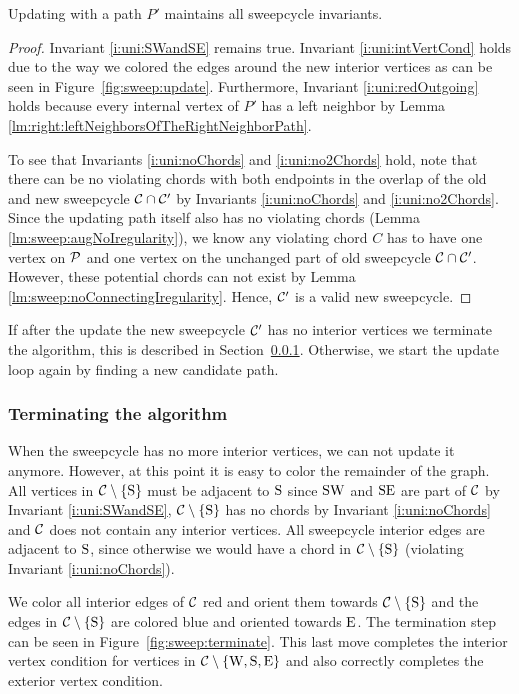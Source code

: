   \begin{lemma}
    \label{lm:sweep:updateMaintainsInvariants}
    Updating with a path $P'$ maintains all sweepcycle invariants.
  \end{lemma}
  \begin{proof}
    Invariant \ref{i:uni:SWandSE} remains true. Invariant \ref{i:uni:intVertCond} holds due to the way we colored the edges around the new interior vertices as can be seen in Figure~\ref{fig:sweep:update}.
    Furthermore, Invariant \ref{i:uni:redOutgoing} holds because every internal vertex of $P'$ has a left neighbor by Lemma \ref{lm:right:leftNeighborsOfTheRightNeighborPath}.

    To see that Invariants \ref{i:uni:noChords} and \ref{i:uni:no2Chords} hold, note that there can be no violating chords with both endpoints in the overlap of the old and new sweepcycle $\C \cap \C'$ by Invariants \ref{i:uni:noChords} and \ref{i:uni:no2Chords}.
    Since the updating path itself also has no violating chords (Lemma \ref{lm:sweep:augNoIregularity}),
    we know any violating chord $C$ has to have one vertex on $\P$ and one vertex on the unchanged part of old sweepcycle $\C \cap \C'$.
    However, these potential chords can not exist by Lemma \ref{lm:sweep:noConnectingIregularity}.
    Hence, $\C'$ is a valid new sweepcycle.
  \end{proof}

  If after the update the new sweepcycle $\C'$ has no interior vertices we terminate the algorithm,  this is described in Section~\ref{sss:terminating}.
  Otherwise, we start the update loop again by finding a new candidate path.

\subsubsection{Terminating the algorithm}
  \label{sss:terminating}
  When the sweepcycle has no more interior vertices, we can not update it anymore.
  However, at this point it is easy to color the remainder of the graph.
  All vertices in $\cpath$ must be adjacent to $\pS$ since $\pS \pW$ and $\pS \pE$ are part of $\C$ by Invariant \ref{i:uni:SWandSE}, $\cpath$ has no chords by Invariant \ref{i:uni:noChords} and $\C$ does not contain any interior vertices.
  All sweepcycle interior edges are adjacent to $\pS$, since otherwise we would have a chord in $\cpath$ (violating Invariant \ref{i:uni:noChords}).

  We color all interior edges of $\C$ red and orient them towards $\cpath$ and the edges in $\cpath$ are colored blue and oriented towards $\pE$. The termination step can be seen in Figure~\ref{fig:sweep:terminate}. This last move completes the interior vertex condition for vertices in $\C \sm {\pW, \pS, \pE}$ and also correctly completes the exterior vertex condition.


